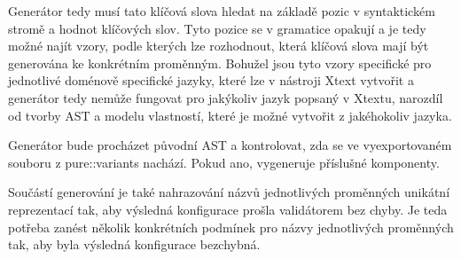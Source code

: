 Generátor tedy musí tato klíčová slova hledat na základě pozic v syntaktickém stromě a hodnot klíčových slov. Tyto pozice se v gramatice opakují a je tedy možné najít vzory, podle kterých lze rozhodnout, která klíčová slova mají být generována ke konkrétním proměnným. Bohužel jsou tyto vzory specifické pro jednotlivé doménově specifické jazyky, které lze v nástroji Xtext vytvořit a generátor tedy nemůže fungovat pro jakýkoliv jazyk popsaný v Xtextu, narozdíl od tvorby AST a modelu vlastností, které je možné vytvořit z jakéhokoliv jazyka.

Generátor bude procházet původní AST a kontrolovat, zda se ve vyexportovaném souboru z pure::variants nachází. Pokud ano, vygeneruje příslušné komponenty.

Součástí generování je také nahrazování názvů jednotlivých proměnných unikátní reprezentací tak, aby výsledná konfigurace prošla validátorem bez chyby. Je teda potřeba zanést několik konkrétních podmínek pro názvy jednotlivých proměnných tak, aby byla výsledná konfigurace bezchybná. 






